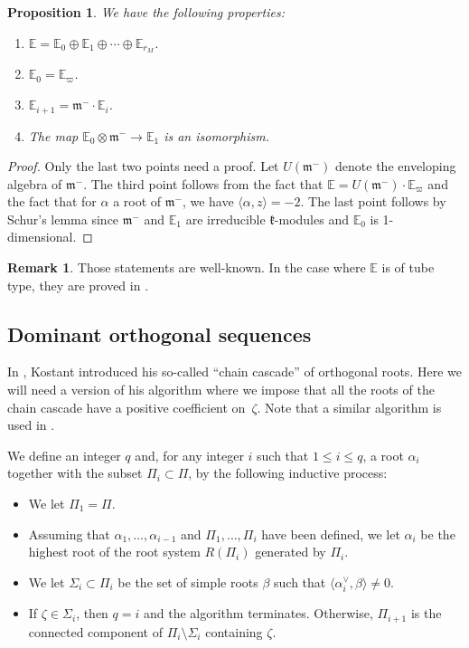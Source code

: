 \documentclass[10pt]{amsart}
\newenvironment{enumeratea}
{\bgroup\def\theenumi{\alph{enumi}}\begin{enumerate}}
{\end{enumerate}\egroup}
\let\oldvee\vee
\renewcommand{\vee}{{\scriptscriptstyle\oldvee}}
\newcommand{\citestar}[3]{\cite[#3]{#1}}
\theoremstyle{plain}
\newtheorem{prop}[theo]{Proposition}
\theoremstyle{definition}
\newtheorem{rema}[theo]{Remark}
\newcommand{\bE}{\mathbb{E}}
\newcommand{\fk}{\mathfrak{k}}
\newcommand{\fm}{\mathfrak{m}}
\newcommand{\rkm}{{r_M}}
\newcommand{\scal}[1]{\langle #1 \rangle}
\begin{document}
\begin{prop}
\label{prop:Ei}
We have the following properties:
\begin{enumeratea}
\item\label{prop:Eia} $\bE = \bE_0 \oplus \bE_{1} \oplus \cdots \oplus \bE_{\rkm}$.
\item\label{prop:Eib} $\bE_0 = \bE_{\varpi}$.
\item\label{prop:Eic} $\bE_{i+1} = \fm^- \cdot \bE_i$.
\item\label{prop:Eid} The map $\bE_0 \otimes \fm^- \to \bE_1$ is an isomorphism.
\end{enumeratea}
\end{prop}
\begin{proof}
Only the last two points need a proof. Let $U(\fm^-)$ denote the enveloping algebra of $\fm^-$. The
third point
follows from the fact that $\bE = U(\fm^-) \cdot \bE_{\varpi}$ and the fact that for $\alpha$ a root of $\fm^-$,
we have $\scal{\alpha,z} = -2 $.
The last point follows by Schur's lemma since $\fm^-$ and $\bE_1$ are irreducible $\fk$-modules and
$\bE_0$ is 1-dimensional.
\end{proof}

\begin{rema}
Those statements are well-known. In the case where $\bE$ is of tube type, they are proved in \citestar{Gross}*{Prop.\,5.2}.
\end{rema}

\subsection{Dominant orthogonal sequences}
\label{subsec:DOS}

In \cite{kostant}, Kostant introduced his so-called ``chain cascade'' of orthogonal roots.
Here we will need a version of his algorithm where we impose that all the roots of the chain cascade
have a positive coefficient on~$\zeta$. Note that a similar algorithm is used in \cite{buch}.

We define an integer $q$ and, for any integer $i$
such that $1 \leq i \leq q$,
a root $\alpha_i$ together with the subset $\Pi_i \subset \Pi$, by the following inductive process:
\begin{itemize}
\item We let $\Pi_1=\Pi$.
\item Assuming that $\alpha_1,\ldots,\alpha_{i-1}$ and $\Pi_1,\ldots,\Pi_i$ have been defined,
we let $\alpha_i$ be the highest root of the root system $R(\Pi_i)$ generated by $\Pi_i$.
\item We let $\Sigma_i \subset \Pi_i$ be the set of simple roots $\beta$ such that
$\scal{\alpha_i^\vee,\beta} \neq 0$.
\item If $\zeta \in \Sigma_i$, then $q=i$ and the algorithm terminates. Otherwise, $\Pi_{i+1}$
is the connected component of $\Pi_i \setminus \Sigma_i$ containing $\zeta$.
\end{itemize}
\end{document}
